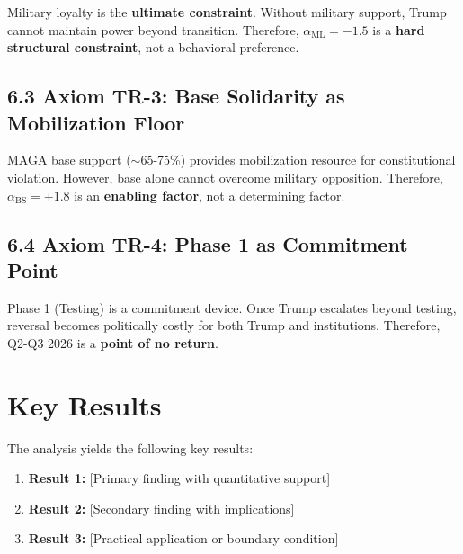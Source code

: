 \begin{fancybox}
Military loyalty is the \textbf{ultimate constraint}. Without military support, Trump cannot maintain power beyond transition. Therefore, $\alpha_{\text{ML}} = -1.5$ is a \textbf{hard structural constraint}, not a behavioral preference.
\end{fancybox}

\subsection{6.3 Axiom TR-3: Base Solidarity as Mobilization Floor}

\begin{fancybox}
MAGA base support ($\sim$65-75\%) provides mobilization resource for constitutional violation. However, base alone cannot overcome military opposition. Therefore, $\alpha_{\text{BS}} = +1.8$ is an \textbf{enabling factor}, not a determining factor.
\end{fancybox}

\subsection{6.4 Axiom TR-4: Phase 1 as Commitment Point}

\begin{fancybox}
Phase 1 (Testing) is a commitment device. Once Trump escalates beyond testing, reversal becomes politically costly for both Trump and institutions. Therefore, Q2-Q3 2026 is a \textbf{point of no return}.
\end{fancybox}


\section{Key Results}
\label{sec:mts-results}

The analysis yields the following key results:

\begin{enumerate}
    \item \textbf{Result 1:} [Primary finding with quantitative support]
    \item \textbf{Result 2:} [Secondary finding with implications]
    \item \textbf{Result 3:} [Practical application or boundary condition]
\end{enumerate}


